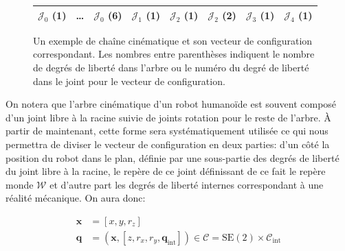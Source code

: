 \begin{figure}[htbp!]
  \begin{center}

  \begin{tabular}{|ccc|c|cc|c|c|}
    \hline
    $\mathcal{J}_0$ (1) & \ldots & $\mathcal{J}_0$ (6)
    & $\mathcal{J}_1$ (1) & $\mathcal{J}_2$ (1) & $\mathcal{J}_2$ (2) & $\mathcal{J}_3$ (1) & $\mathcal{J}_4$ (1)\\
    \hline
  \end{tabular}
  \end{center}

  \caption{Un exemple de chaîne cinématique et son vecteur de
    configuration correspondant. Les nombres entre parenthèses
    indiquent le nombre de degrés de liberté dans l'arbre ou le numéro
    du degré de liberté dans le joint pour le vecteur de
    configuration.}
\end{figure}

On notera que l'arbre cinématique d'un robot humanoïde est souvent
composé d'un joint libre à la racine suivie de joints rotation pour le
reste de l'arbre. À partir de maintenant, cette forme sera
systématiquement utilisée ce qui nous permettra de diviser le vecteur
de configuration en deux parties: d'un côté la position du robot dans
le plan, définie par une sous-partie des degrés de liberté du joint
libre à la racine, le repère de ce joint définissant de ce fait le
repère monde $\mathcal{W}$ et d'autre part les degrés de liberté
internes correspondant à une réalité mécanique. On aura donc:

\begin{equation} \label{eq:chap2_configuration}
  \begin{aligned}
    \mathbf{x} &= [x, y, r_z]\\
    \mathbf{q} &= (\mathbf{x}, [z, r_x, r_y, \mathbf{q}_{\text{int}}])
    \in \mathcal{C} = \text{SE}(2) \times \mathcal{C}_{\text{int}}
  \end{aligned}
\end{equation}

